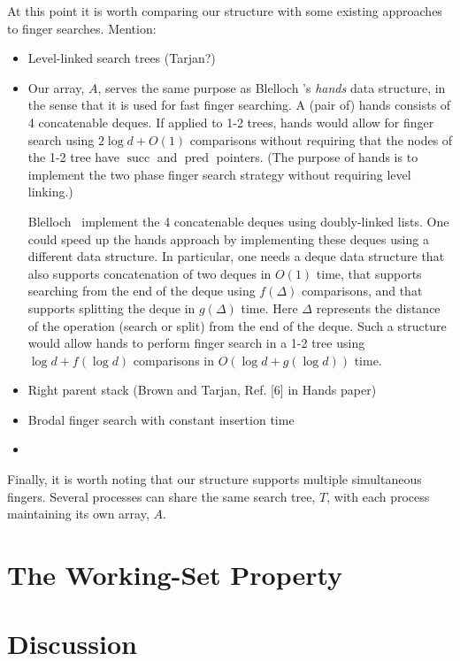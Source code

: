 \documentclass{patmorin}
\DeclareMathOperator{\scc}{succ}
\DeclareMathOperator{\pred}{pred}
\begin{document}
At this point it is worth comparing our structure with some existing
approaches to finger searches.  Mention:
\begin{itemize}
  \item Level-linked search trees (Tarjan?)

  \item Our array, $A$, serves the same purpose as Blelloch \etal's
    \emph{hands} data structure, in the sense that it is used for fast
    finger searching.  A (pair of) hands consists of 4 concatenable
    deques.  If applied to 1-2 trees, hands would allow for finger search
    using $2\log d+O(1)$ comparisons without requiring that the nodes
    of the 1-2 tree have $\scc$ and $\pred$ pointers.  (The purpose of
    hands is to implement the two phase finger search strategy without
    requiring level linking.)

    Blelloch \etal\ implement the 4 concatenable deques using
    doubly-linked lists.  One could speed up the hands approach
    by implementing these deques using a different data structure.
    In particular, one needs a deque data structure that also supports
    concatenation of two deques in $O(1)$ time, that supports searching
    from the end of the deque using $f(\Delta)$ comparisons, and that
    supports splitting the deque in $g(\Delta)$ time.  Here $\Delta$
    represents the distance of the operation (search or split) from the
    end of the deque.  Such a structure would allow hands to perform
    finger search in a 1-2 tree using $\log d + f(\log d)$ comparisons
    in $O(\log d + g(\log d))$ time.


  \item Right parent stack (Brown and Tarjan, Ref. [6] in Hands paper)
  \item Brodal finger search with constant insertion time
  \item 
\end{itemize}

Finally, it is worth noting that our structure supports multiple
simultaneous fingers.  Several processes can share the same search tree,
$T$, with each process maintaining its own array, $A$.


\section{The Working-Set Property}

\section{Discussion}
\end{document}
